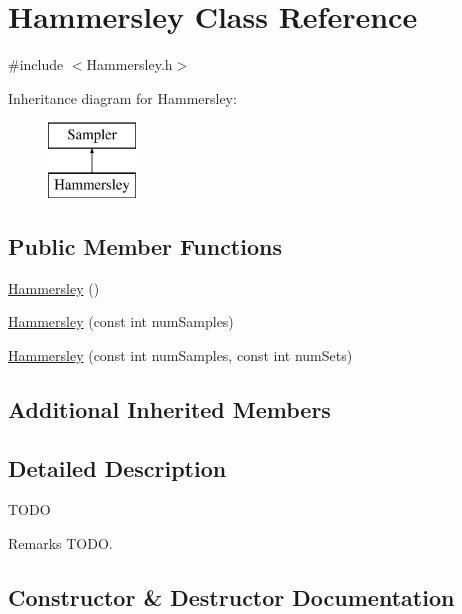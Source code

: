\hypertarget{class_hammersley}{}\section{Hammersley Class Reference}
\label{class_hammersley}


{\ttfamily \#include $<$Hammersley.\+h$>$}

Inheritance diagram for Hammersley\+:\begin{figure}[H]
\begin{center}
\leavevmode
\includegraphics[height=2.000000cm]{class_hammersley}
\end{center}
\end{figure}
\subsection*{Public Member Functions}
\begin{DoxyCompactItemize}
\item 
\hyperlink{class_hammersley_a326c4955c1013974aff591c9425c9be7}{Hammersley} ()
\item 
\hyperlink{class_hammersley_afeef5879129f035ef70c87cecce7aaa9}{Hammersley} (const int num\+Samples)
\item 
\hyperlink{class_hammersley_a7e59d7d7df2709d1ccf3beedfb3da33b}{Hammersley} (const int num\+Samples, const int num\+Sets)
\end{DoxyCompactItemize}
\subsection*{Additional Inherited Members}


\subsection{Detailed Description}
T\+O\+DO \begin{DoxyRemark}{Remarks}
T\+O\+DO. 
\end{DoxyRemark}


\subsection{Constructor \& Destructor Documentation}
\hypertarget{class_hammersley_a326c4955c1013974aff591c9425c9be7}{}\label{class_hammersley_a326c4955c1013974aff591c9425c9be7} 
